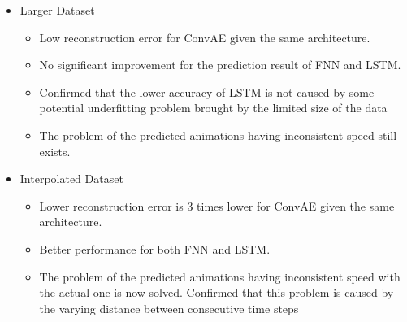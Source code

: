{\begin{itemize}
\begin{itemize}
            \item predicted animations generated by FNN and LSTM are either moving faster or slower than the actual simulations
            
        \end{itemize}
        
    \item Larger Dataset
        \begin{itemize}
            \item Low reconstruction error for ConvAE given the same architecture.

            \item No significant improvement for the prediction result of FNN and LSTM.

            \item Confirmed that the lower accuracy of LSTM is not caused by some potential underfitting problem brought by the limited size of the data
            
            \item The problem of the predicted animations having inconsistent speed still exists.
            
        \end{itemize}

        
    \item Interpolated Dataset
    
    \begin{itemize}
            \item Lower reconstruction error is 3 times lower for ConvAE given the same architecture.

            \item Better performance for both FNN and LSTM.
            
            \item The problem of the predicted animations having inconsistent speed with the actual one is now solved. Confirmed that this problem is caused by the varying distance between consecutive time steps
            
    \end{itemize} 
 
        
\end{itemize}

}
